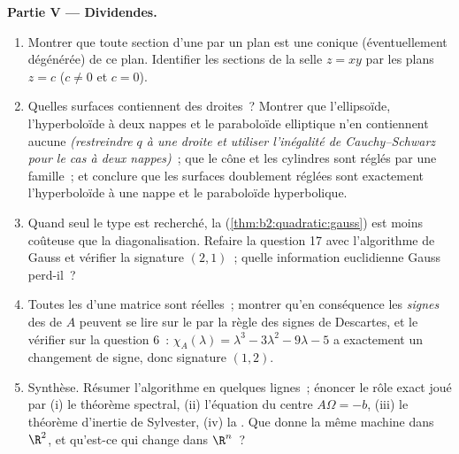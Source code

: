 \begin{problem}
\medskip
\noindent\textbf{Partie V --- Dividendes.}
\begin{enumerate}[resume]
  \item Montrer que toute section d'une  par un plan
         est une conique (éventuellement dégénérée) de ce plan.
        Identifier les sections de la selle $z = xy$ par les
        plans $z = c$ ($c \neq 0$ et $c = 0$).
  \item Quelles surfaces  contiennent des droites~? Montrer
        que l'ellipsoïde, l'hyperboloïde à deux nappes et le
        paraboloïde elliptique n'en contiennent aucune \emph{(restreindre $q$
        à une droite et utiliser l'inégalité de Cauchy--Schwarz pour
        le cas à deux nappes)}~; que le cône et les cylindres sont
        réglés par une famille~; et conclure que les surfaces
         doublement réglées sont exactement l'hyperboloïde à
        une nappe et le paraboloïde hyperbolique.
  \item Quand seul le type \emph{} est recherché, la
         (\cref{thm:b2:quadratic:gauss}) est
        moins coûteuse que la diagonalisation. Refaire la question 17
        avec l'algorithme de Gauss et vérifier la signature $(2, 1)$~;
        quelle information euclidienne Gauss perd-il~?
  \item Toutes les  d'une matrice  sont
        réelles~; montrer qu'en conséquence les \emph{signes}
        des  de $A$ peuvent se lire sur le  par la règle des signes de Descartes, et le
        vérifier sur la question 6~: $\chi_A(\lambda) = \lambda^3 - 3\lambda^2
        - 9\lambda - 5$ a exactement un changement de signe, donc
        signature $(1, 2)$.
  \item Synthèse. Résumer l'algorithme en quelques lignes~;
        énoncer le rôle exact joué par (i) le théorème spectral,
        (ii) l'équation du centre $A\Omega = -b$,
        (iii) le théorème d'inertie de Sylvester, (iv) la . Que donne la même machine dans $\R^2$, et
        qu'est-ce qui change dans $\R^n$~?
\end{enumerate}
\end{problem}
